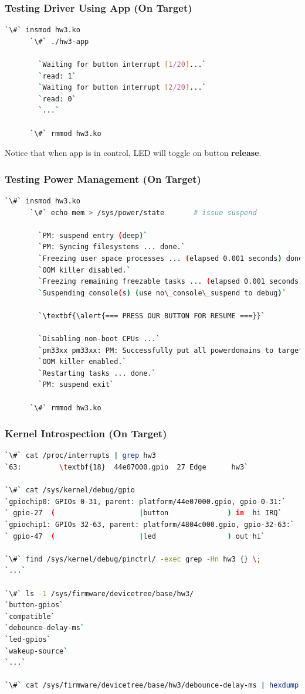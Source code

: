 \documentclass[aspectratio=169,usenames,dvipsnames]{beamer}
\newcounter{cont}
\begin{document}
\begin{frame}[containsverbatim]
  \frametitle{Testing Driver Using App (On Target)}
  \begin{lstlisting}[language=bash,numbers=none]
      `\#` insmod hw3.ko
      `\#` ./hw3-app

        `Waiting for button interrupt [1/20]...`
        `read: 1`
        `Waiting for button interrupt [2/20]...`
        `read: 0`
        `...`

      `\#` rmmod hw3.ko
  \end{lstlisting}
  Notice that when app is in control, LED will toggle on button
  \textbf{release}.
\end{frame}

\begin{frame}[containsverbatim]
  \frametitle{Testing Power Management (On Target)}
  \begin{lstlisting}[language=bash,numbers=none]
      `\#` insmod hw3.ko
      `\#` echo mem > /sys/power/state       # issue suspend

        `PM: suspend entry (deep)`
        `PM: Syncing filesystems ... done.`
        `Freezing user space processes ... (elapsed 0.001 seconds) done.`
        `OOM killer disabled.`
        `Freezing remaining freezable tasks ... (elapsed 0.001 seconds) done.`
        `Suspending console(s) (use no\_console\_suspend to debug)`

        `\textbf{\alert{=== PRESS OUR BUTTON FOR RESUME ===}}`

        `Disabling non-boot CPUs ...`
        `pm33xx pm33xx: PM: Successfully put all powerdomains to target state`
        `OOM killer enabled.`
        `Restarting tasks ... done.`
        `PM: suspend exit`

      `\#` rmmod hw3.ko
  \end{lstlisting}
\end{frame}

\begin{frame}[containsverbatim]
  \frametitle{Kernel Introspection (On Target)}
  \begin{lstlisting}[language=bash,numbers=none]
`\#` cat /proc/interrupts | grep hw3
`63:         \textbf{18}  44e07000.gpio  27 Edge      hw3`

`\#` cat /sys/kernel/debug/gpio
`gpiochip0: GPIOs 0-31, parent: platform/44e07000.gpio, gpio-0-31:`
` gpio-27  (                    |button              ) in  hi IRQ`
`gpiochip1: GPIOs 32-63, parent: platform/4804c000.gpio, gpio-32-63:`
` gpio-47  (                    |led                 ) out hi`

`\#` find /sys/kernel/debug/pinctrl/ -exec grep -Hn hw3 {} \;
`...`

`\#` ls -1 /sys/firmware/devicetree/base/hw3/
`button-gpios`
`compatible`
`debounce-delay-ms`
`led-gpios`
`wakeup-source`
`...`

`\#` cat /sys/firmware/devicetree/base/hw3/debounce-delay-ms | hexdump
  \end{lstlisting}
  \vspace*{-10mm}
\end{frame}
\end{document}
